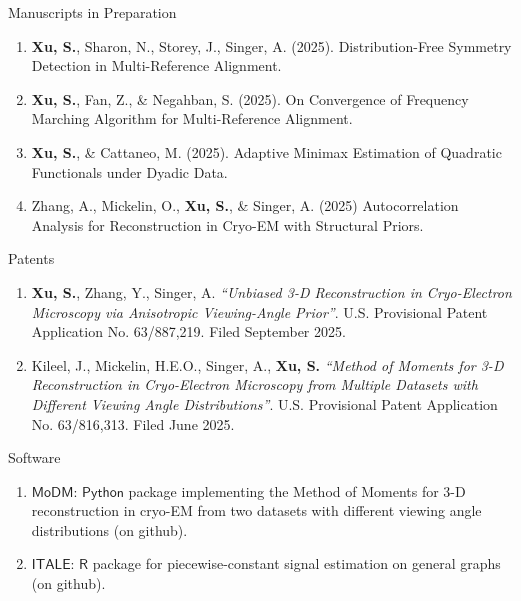 \documentclass{article}
\begin{document}
\begin{large}
\noindent Manuscripts in Preparation
\end{large}

\begin{enumerate}
\item \textbf{Xu, S.}, Sharon, N., Storey, J., Singer, A. (2025). Distribution-Free Symmetry Detection in Multi-Reference Alignment. 

\item \textbf{Xu, S.}, Fan, Z., \& Negahban, S. (2025). On Convergence of Frequency Marching
Algorithm for Multi-Reference Alignment. 

\item \textbf{Xu, S.}, \& Cattaneo, M. (2025). Adaptive Minimax Estimation of Quadratic Functionals under Dyadic Data.

\item Zhang, A., Mickelin, O., \textbf{Xu, S.}, \& Singer, A. (2025) Autocorrelation Analysis for Reconstruction in Cryo-EM with Structural Priors.

\end{enumerate}


\begin{large}
\noindent Patents
\end{large}

\begin{enumerate}
\item \textbf{Xu, S.}, Zhang, Y., Singer, A. \emph{``Unbiased 3-D Reconstruction in Cryo-Electron Microscopy via Anisotropic Viewing-Angle Prior''}. U.S. Provisional Patent Application No. 63/887,219. Filed September 2025.

\item Kileel, J., Mickelin, H.E.O., Singer, A., \textbf{Xu, S.} \emph{``Method of Moments for 3-D Reconstruction in Cryo-Electron Microscopy from Multiple Datasets with Different Viewing Angle Distributions''}. U.S. Provisional Patent Application No. 63/816,313. Filed June 2025.
\end{enumerate}



\begin{large}
\noindent Software
\end{large}

\begin{enumerate}

\item $\mathsf{MoDM}$: $\mathsf{Python}$ package implementing the Method of Moments for 3-D reconstruction in cryo-EM from two datasets with different viewing angle distributions (on github).

\item $\mathsf{ITALE}$: $\mathsf{R}$ package for piecewise-constant signal estimation on general graphs (on github).

\end{enumerate}
\end{document}
